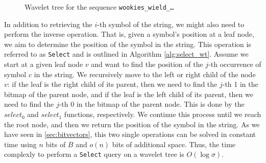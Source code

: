 \begin{figure}[h]
    \centering
    \caption{Wavelet tree for the sequence \texttt{wookies\_wield\_\dots}} \label{fig:wavelet_tree_example}
\end{figure}

\noindent In addition to retrieving the $i$-th symbol of the string, we might also need to perform the inverse operation. That is, given a symbol's position at a leaf node, we aim to determine the position of the symbol in the string. This operation is referred to as \texttt{Select} and is outlined in Algorithm \ref{alg:select_wt}. Assume we start at a given leaf node $v$ and want to find the position of the $j$-th occurrence of symbol $c$ in the string. We recursively move to the left or right child of the node $v$: if the leaf is the right child of its parent, then we need to find the $j$-th 1 in the bitmap of the parent node, and if the leaf is the left child of its parent, then we need to find the $j$-th 0 in the bitmap of the parent node. This is done by the $select_0$ and $select_1$ functions, respectively. We continue this process until we reach the root node, and then we return the position of the symbol in the string. As we have seen in \autoref{sec:bitvectors}, this two single operations can be solved in constant time using $n$ bits of $B$ and $o(n)$ bits of additional space. Thus, the time complexly to perform a \texttt{Select} query on a wavelet tree is $O(\log \sigma)$. \vspace{0.4cm}


